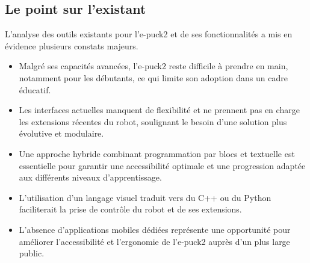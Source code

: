 \subsection{Le point sur l'existant} \label{sec:point_existant}

L’analyse des outils existants pour l’e-puck2 et de ses fonctionnalités a mis en évidence plusieurs constats majeurs.  

\begin{itemize}
    \item Malgré ses capacités avancées, l’e-puck2 reste difficile à prendre en main, notamment pour les débutants, ce qui limite son adoption dans un cadre éducatif.

    \item Les interfaces actuelles manquent de flexibilité et ne prennent pas en charge les extensions récentes du robot, soulignant le besoin d’une solution plus évolutive et modulaire. 

    \item Une approche hybride combinant programmation par blocs et textuelle est essentielle pour garantir une accessibilité optimale et une progression adaptée aux différents niveaux d’apprentissage.

    \item L’utilisation d’un langage visuel traduit vers du C++ ou du Python faciliterait la prise de contrôle du robot et de ses extensions.

    \item L’absence d’applications mobiles dédiées représente une opportunité pour améliorer l’accessibilité et l’ergonomie de l’e-puck2 auprès d’un plus large public.
\end{itemize}
